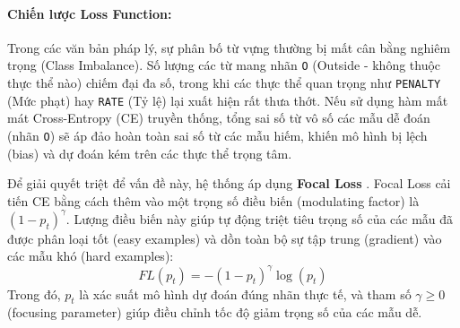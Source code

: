 \paragraph{Chiến lược Loss Function:}
Trong các văn bản pháp lý, sự phân bố từ vựng thường bị mất cân bằng nghiêm trọng (Class Imbalance). Số lượng các từ mang nhãn \texttt{O} (Outside - không thuộc thực thể nào) chiếm đại đa số, trong khi các thực thể quan trọng như \texttt{PENALTY} (Mức phạt) hay \texttt{RATE} (Tỷ lệ) lại xuất hiện rất thưa thớt. Nếu sử dụng hàm mất mát Cross-Entropy (CE) truyền thống, tổng sai số từ vô số các mẫu dễ đoán (nhãn \texttt{O}) sẽ áp đảo hoàn toàn sai số từ các mẫu hiếm, khiến mô hình bị lệch (bias) và dự đoán kém trên các thực thể trọng tâm.

Để giải quyết triệt để vấn đề này, hệ thống áp dụng \textbf{Focal Loss} \autocite{focalloss}. Focal Loss cải tiến CE bằng cách thêm vào một trọng số điều biến (modulating factor) là $(1 - p_t)^\gamma$. Lượng điều biến này giúp tự động triệt tiêu trọng số của các mẫu đã được phân loại tốt (easy examples) và dồn toàn bộ sự tập trung (gradient) vào các mẫu khó (hard examples):
\begin{equation}
FL(p_t) = -(1 - p_t)^\gamma \log(p_t)
\end{equation}
Trong đó, $p_t$ là xác suất mô hình dự đoán đúng nhãn thực tế, và tham số $\gamma \ge 0$ (focusing parameter) giúp điều chỉnh tốc độ giảm trọng số của các mẫu dễ.


